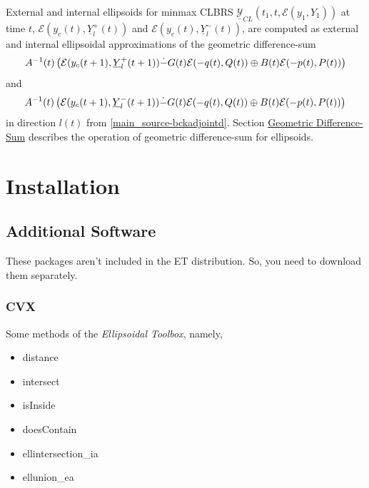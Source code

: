\documentclass[letterpaper,10pt,english]{sphinxmanual}
\begin{document}
External and internal ellipsoids for minmax CLBRS
$\underline{{\mathcal Y}}_{CL}(t_1,t,{\mathcal E}(y_1,Y_1))$ at
time $t$, ${\mathcal E}(y_c(t),\underline{Y}^+_l(t))$ and
${\mathcal E}(y_c(t),\underline{Y}^-_l(t))$, are computed as
external and internal ellipsoidal approximations of the geometric
difference-sum
\begin{gather}
\begin{split}A^{-1}(t)\left(
{\mathcal E}(y_c(t+1),\underline{Y}^+_l(t+1))
\dot{-}G(t){\mathcal E}(-q(t),Q(t))
\oplus B(t){\mathcal E}(-p(t),P(t))
\right)\end{split}\notag
\end{gather}
and
\begin{gather}
\begin{split}A^{-1}(t)\left(
{\mathcal E}(y_c(t+1),\underline{Y}^-_l(t+1))
\dot{-}G(t){\mathcal E}(-q(t),Q(t))
\oplus B(t){\mathcal E}(-p(t),P(t))
\right)\end{split}\notag
\end{gather}
in direction $l(t)$ from \eqref{main_source-bckadjointd}. Section
{\hyperref[main_source:geometric-difference-sum]{Geometric Difference-Sum}} describes the operation of geometric
difference-sum for ellipsoids.


\chapter{Installation}
\label{main_source:installation}

\section{Additional Software}
\label{main_source:additional-software}
These packages aren’t included in the ET distribution. So, you need to
download them separately.


\subsection{CVX}
\label{main_source:cvx}
Some methods of the \emph{Ellipsoidal Toolbox}, namely,
\begin{itemize}
\item {} 
distance

\item {} 
intersect

\item {} 
isInside

\item {} 
doesContain

\item {} 
ellintersection\_ia

\item {} 
ellunion\_ea

\end{itemize}
\end{document}
